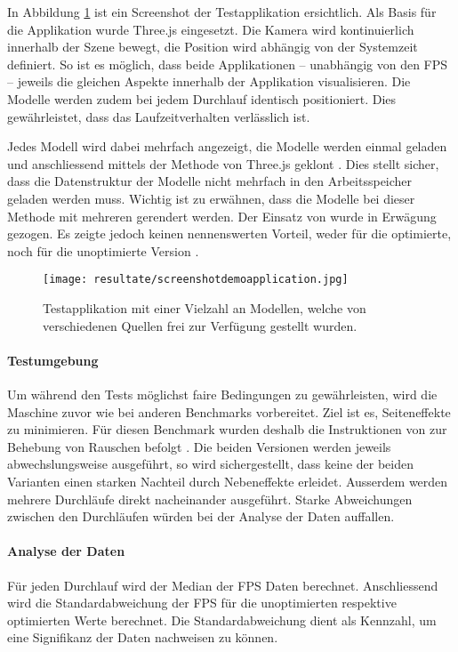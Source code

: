 In Abbildung \ref{fig:demoApplication} ist ein Screenshot der Testapplikation ersichtlich. Als Basis für die Applikation wurde Three.js eingesetzt. Die Kamera wird kontinuierlich innerhalb der Szene bewegt, die Position wird abhängig von der Systemzeit definiert. So ist es möglich, dass beide Applikationen – unabhängig von den \gls{FPS} – jeweils die gleichen Aspekte innerhalb der Applikation visualisieren. Die Modelle werden zudem bei jedem Durchlauf identisch positioniert. Dies gewährleistet, dass das Laufzeitverhalten verlässlich ist.

Jedes Modell wird dabei mehrfach angezeigt, die Modelle werden einmal geladen und anschliessend mittels der  Methode von Three.js geklont \cite{threeObject3DClone}. Dies stellt sicher, dass die Datenstruktur der Modelle nicht mehrfach in den Arbeitsspeicher geladen werden muss. Wichtig ist zu erwähnen, dass die Modelle bei dieser Methode mit mehreren  gerendert werden. Der Einsatz von  wurde in Erwägung gezogen. Es zeigte jedoch keinen nennenswerten Vorteil, weder für die optimierte, noch für die unoptimierte Version \cite{threeInstancedMesh}.

\begin{figure}[H]
  \centering
  \texttt{[image: resultate/screenshotdemoapplication.jpg]}
  \caption{Testapplikation mit einer Vielzahl an Modellen, welche von verschiedenen Quellen frei zur Verfügung gestellt wurden.}
  \label{fig:demoApplication}
\end{figure}

\paragraph{Testumgebung}
Um während den Tests möglichst faire Bedingungen zu gewährleisten, wird die Maschine zuvor wie bei anderen Benchmarks vorbereitet. Ziel ist es, Seiteneffekte zu minimieren. Für diesen Benchmark wurden deshalb die Instruktionen von  zur Behebung von Rauschen befolgt \cite{tracerBenchNoiseMitigation}. Die beiden Versionen werden jeweils abwechslungsweise ausgeführt, so wird sichergestellt, dass keine der beiden Varianten einen starken Nachteil durch Nebeneffekte erleidet. Ausserdem werden mehrere Durchläufe direkt nacheinander ausgeführt. Starke Abweichungen zwischen den Durchläufen würden bei der Analyse der Daten auffallen.

\pagebreak

\paragraph{Analyse der Daten}
Für jeden Durchlauf wird der Median der \gls{FPS} Daten berechnet.
Anschliessend wird die Standardabweichung der \gls{FPS} für die unoptimierten respektive optimierten Werte berechnet. Die Standardabweichung dient als Kennzahl, um eine Signifikanz der Daten nachweisen zu können.

